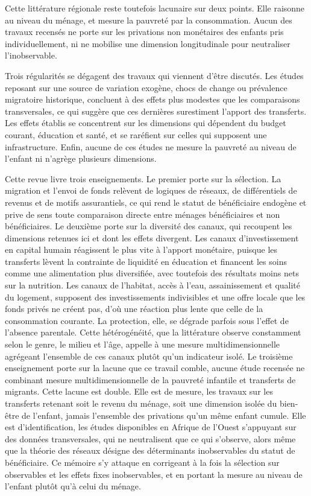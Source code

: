 Cette littérature régionale reste toutefois lacunaire sur deux points. Elle
raisonne au niveau du ménage, et mesure la pauvreté par la consommation. Aucun
des travaux recensés ne porte sur les privations non monétaires des enfants
pris individuellement, ni ne mobilise une dimension longitudinale pour
neutraliser l'inobservable.

\bigskip

Trois régularités se dégagent des travaux qui viennent d'être
discutés. Les études reposant sur
une source de variation exogène, chocs de change ou prévalence migratoire
historique, concluent à des effets plus modestes que les comparaisons
transversales, ce qui suggère que ces dernières surestiment l'apport des
transferts. Les effets établis se concentrent sur les dimensions qui dépendent
du budget courant, éducation et santé, et se raréfient sur celles qui
supposent une infrastructure. Enfin, aucune de ces études ne mesure la
pauvreté au niveau de l'enfant ni n'agrège plusieurs dimensions.

Cette revue livre trois enseignements. Le premier porte sur la sélection.
La migration et l'envoi de fonds relèvent de logiques de réseaux, de différentiels
de revenus et de motifs assurantiels, ce qui rend le statut de bénéficiaire
endogène et prive de sens toute comparaison directe entre ménages
bénéficiaires et non bénéficiaires. Le deuxième porte sur la diversité des
canaux, qui recoupent les dimensions retenues ici et dont les effets
divergent. Les canaux d'investissement en capital humain réagissent le plus
vite à l'apport monétaire, puisque les transferts lèvent la contrainte de
liquidité en éducation et financent les soins comme une alimentation plus
diversifiée, avec toutefois des résultats moins nets sur la nutrition. Les
canaux de l'habitat, accès à l'eau, assainissement et qualité du logement,
supposent des investissements indivisibles et une offre locale que les fonds
privés ne créent pas, d'où une réaction plus lente que celle de la
consommation courante. La protection, elle, se dégrade parfois sous l'effet de
l'absence parentale. Cette hétérogénéité, que la littérature observe
constamment selon le genre, le milieu et l'âge, appelle à une mesure
multidimensionnelle agrégeant l'ensemble de ces canaux plutôt qu'un indicateur
isolé. Le troisième enseignement porte sur la lacune que ce travail comble,
aucune étude recensée ne combinant mesure multidimensionnelle de la pauvreté
infantile et transferts de migrants. Cette lacune est double. Elle est de
mesure, les travaux sur les transferts retenant soit le revenu du ménage, soit
une dimension isolée du bien-être de l'enfant, jamais l'ensemble des privations
qu'un même enfant cumule. Elle est d'identification, les études disponibles en
Afrique de l'Ouest s'appuyant sur des données transversales, qui ne
neutralisent que ce qui s'observe, alors même que la théorie des réseaux
désigne des déterminants inobservables du statut de bénéficiaire. Ce
mémoire s'y attaque en corrigeant à la fois la sélection sur observables et
les effets fixes inobservables, et en portant la mesure au niveau de l'enfant
plutôt qu'à celui du ménage.
